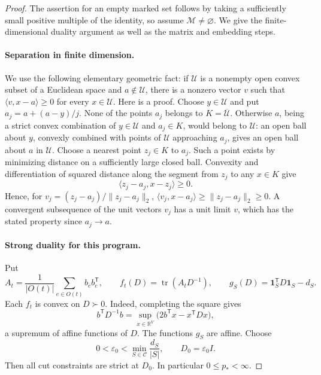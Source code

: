 \begin{proof}
The assertion for an empty marked set follows by taking a sufficiently
small positive multiple of the identity, so assume $\mathcal M\ne\varnothing$.
We give the finite-dimensional duality argument as well as the matrix
and embedding steps.

\paragraph{Separation in finite dimension.}
We use the following elementary geometric fact: if $\mathcal U$ is a
nonempty open convex subset of a Euclidean space and $a\notin\mathcal U$,
there is a nonzero vector $v$ such that
$\langle v,x-a\rangle\geq0$ for every $x\in\mathcal U$.
Here is a proof.  Choose $y\in\mathcal U$ and put
$a_j=a+(a-y)/j$.  None of the points $a_j$ belongs to
$K=\overline{\mathcal U}$.  Otherwise $a$, being a strict convex
combination of $y\in\mathcal U$ and $a_j\in K$, would belong to
$\mathcal U$: an open ball about $y$, convexly combined with points of
$\mathcal U$ approaching $a_j$, gives an open ball about $a$ in
$\mathcal U$.  Choose a nearest point $z_j\in K$ to $a_j$.
Such a point exists by minimizing distance on a sufficiently large
closed ball.  Convexity and differentiation of squared distance along
the segment from $z_j$ to any $x\in K$ give
\[
 \langle z_j-a_j,x-z_j\rangle\geq0.
\]
Hence, for $v_j=(z_j-a_j)/\|z_j-a_j\|_2$,
$\langle v_j,x-a_j\rangle\geq\|z_j-a_j\|_2\geq0$.
A convergent subsequence of the unit vectors $v_j$ has a unit limit
$v$, which has the stated property since $a_j\to a$.

\paragraph{Strong duality for this program.}
Put
\[
 A_t=\frac1{|O(t)|}\sum_{e\in O(t)}b_eb_e^{\mathsf T},\qquad
 f_t(D)=\operatorname{tr}(A_tD^{-1}),\qquad
 g_S(D)=\mathbf1_S^{\mathsf T}D\mathbf1_S-d_S.
\]
Each $f_t$ is convex on $D\succ0$.  Indeed, completing the square gives
\[
 b^{\mathsf T}D^{-1}b
   =\sup_{x\in\mathbb R^V}
      \bigl(2b^{\mathsf T}x-x^{\mathsf T}Dx\bigr),
\]
a supremum of affine functions of $D$.  The functions $g_S$ are affine.
Choose
\[
 0<\varepsilon_0<\min_{S\in\mathcal C}\frac{d_S}{|S|},
 \qquad D_0=\varepsilon_0 I.
\]
Then all cut constraints are strict at $D_0$.  In particular
$0\leq p_*<\infty$.


\end{proof}
